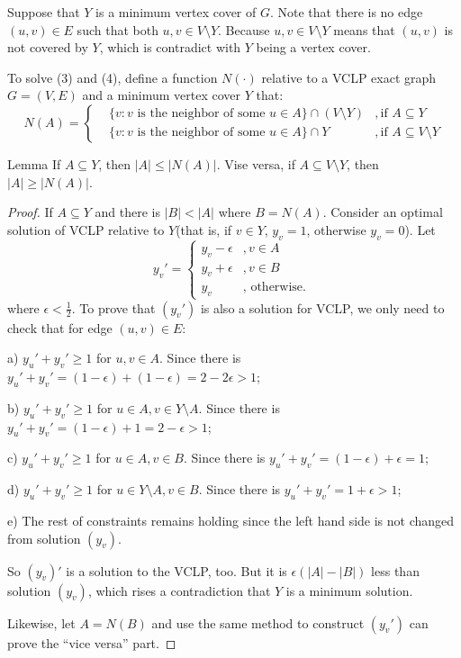     Suppose that $Y$ is a minimum vertex cover of $G$. Note that there is no edge $(u, v) \in E$ such that both $u, v \in V \setminus Y$. Because $u, v \in V \setminus Y$ means that $(u, v)$ is not covered by $Y$, which is contradict with $Y$ being a vertex cover.

    To solve (3) and (4), define a function $N(\cdot)$ relative to 
    a VCLP exact graph $G=(V,E)$ and a minimum vertex cover $Y$ that: 
    $$
    N(A)=\left\{
        \begin{aligned}
        &\{v:v\text{ is the neighbor of some }u\in A\}\cap (V \setminus Y) &, \text{if }A\subseteq Y \\
        &\{v:v\text{ is the neighbor of some }u\in A\}\cap Y &, \text{if }A\subseteq V \setminus Y 
        \end{aligned}
    \right.
    $$
    \begin{thm}{Lemma}{}
        If $A\subseteq Y$, then $|A|\leq |N(A)|$. Vise versa, 
        if $A\subseteq V \setminus Y$, then $|A|\geq |N(A)|$. 
    \end{thm}
    \begin{proof}
        If $A\subseteq Y$ and there is $|B|<|A|$ where $B=N(A)$. 
        Consider an optimal solution of VCLP relative to $Y$(that is, if $v\in Y$, $y_v=1$, otherwise $y_v=0$). Let 
        \begin{equation*}
            y_v'=
            \begin{cases}
                y_v-\epsilon&,v\in A\\
                y_v+\epsilon&,v\in B\\
                y_v &,\text{ otherwise. }
            \end{cases}
        \end{equation*}
        where $\epsilon < \frac{1}{2}$. To prove that $(y_v')$ is also a solution for VCLP, we only need to check that for edge $(u, v) \in E$: 

        a) $y_u'+y_v'\geq 1$ for $u,v\in A$. Since there is $y_u'+y_v'= (1-\epsilon)+(1-\epsilon)=2-2\epsilon>1$; 
        
        b) $y_u' + y_v' \geq 1$ for $u \in A, v \in Y \setminus A$. Since there is $y_u' + y_v' = (1 - \epsilon) + 1 = 2 - \epsilon > 1$;

        c) $y_u'+y_v'\geq 1$ for $u\in A, v\in B$. Since there is $y_u'+y_v' = (1-\epsilon) + \epsilon=1$;
        
        d) $y_u' + y_v' \geq 1$ for $u \in Y \setminus A, v \in B$. Since there is $y_u' + y_v' = 1 + \epsilon > 1$;

        e) The rest of constraints remains holding since the left hand side is not changed from solution $(y_v)$. 

        So $(y_v)'$ is a solution to the VCLP, too. But it is $\epsilon(|A|-|B|)$ less than solution $(y_v)$, which rises a contradiction that $Y$ is a minimum solution. 
        
        Likewise, let $A=N(B)$ and use the same method to construct $(y_v')$ can prove the ``vice versa'' part. 
    \end{proof}

